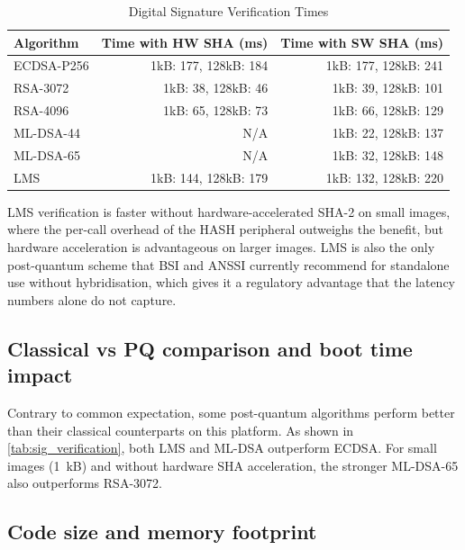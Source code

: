 \begin{table}[h]
\centering
\begin{tabular}{|l|r|r|}
\hline
\textbf{Algorithm} & \textbf{Time with HW SHA (ms)} & \textbf{Time with SW SHA (ms)} \\
\hline
ECDSA-P256 & 1kB: 177, 128kB: 184   & 1kB: 177, 128kB: 241 \\
RSA-3072   & 1kB: 38, 128kB: 46     & 1kB: 39, 128kB: 101  \\
RSA-4096   & 1kB: 65, 128kB: 73     & 1kB: 66, 128kB: 129  \\
ML-DSA-44  & N/A                    & 1kB: 22, 128kB: 137  \\
ML-DSA-65  & N/A                    & 1kB: 32, 128kB: 148  \\
LMS        & 1kB: 144, 128kB: 179   & 1kB: 132, 128kB: 220 \\

\hline
\end{tabular}
\caption{Digital Signature Verification Times}
\label{tab:sig_verification}
\end{table}

LMS verification is faster without hardware-accelerated SHA-2 on small images, where the per-call overhead of the HASH peripheral outweighs the benefit, but hardware acceleration is advantageous on larger images. LMS is also the only post-quantum scheme that BSI and ANSSI currently recommend for standalone use without hybridisation, which gives it a regulatory advantage that the latency numbers alone do not capture.

\subsection{Classical vs PQ comparison and boot time impact}
\label{subsection:eval-benchmarks-classicVSpq}

Contrary to common expectation, some post-quantum algorithms perform better than their classical counterparts on this platform. As shown in \autoref{tab:sig_verification}, both LMS and ML-DSA outperform ECDSA. For small images (1~kB) and without hardware SHA acceleration, the stronger ML-DSA-65 also outperforms RSA-3072.

\subsection{Code size and memory footprint}
\label{subsection:eval-benchmarks-memory}

